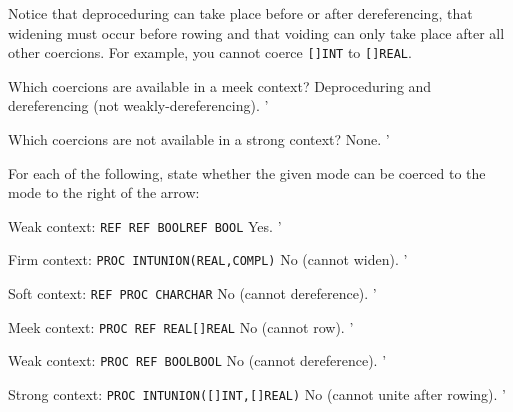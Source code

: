 Notice that deproceduring can take place before or after
dereferencing, that widening must occur before rowing and that
voiding can only take place after all other coercions. For example,
you cannot coerce \verb|[]INT| to \verb|[]REAL|.

\begin{exercise}
\item Which coercions are available in a meek context?
\ans Deproceduring and dereferencing (not weakly-deref\-eren\-cing).
'
\item Which coercions are not available in a strong context?
\ans None.
'
\item For each of the following, state whether the given mode can be
coerced to the mode to the right of the arrow:
\begin{subex}
\item Weak context: \verb|REF REF BOOL|\co\verb|REF BOOL| \subans Yes.
'
\item Firm context: \verb|PROC INT|\co\verb|UNION(REAL,COMPL)|
\subans No (cannot widen).
'
\item Soft context: \verb|REF PROC CHAR|\co\verb|CHAR| \subans No
(cannot dereference).
'
\item Meek context: \verb|PROC REF REAL|\co\verb|[]REAL| \subans No
(cannot row).
'
\item Weak context: \verb|PROC REF BOOL|\co\verb|BOOL| \subans No
(cannot dereference).
'
\item Strong context: \verb|PROC INT|\co\verb|UNION([]INT,[]REAL)|
\subans No (cannot unite after rowing).
'
\end{subex}
\end{exercise}

